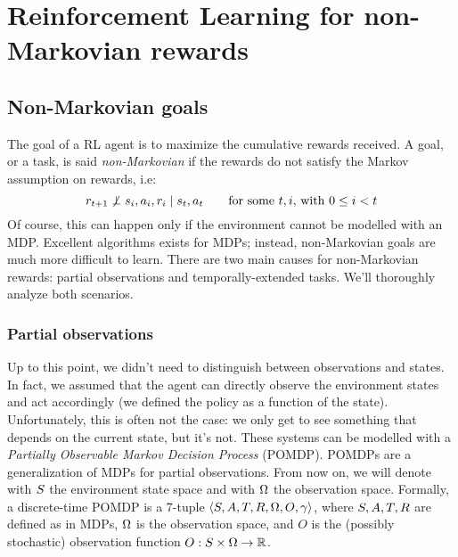 \chapter{Reinforcement Learning for non-Markovian rewards}

\label{ch:nonmarkovrl}

\section{Non-Markovian goals}

\label{sec:non-markov}

The goal of a RL agent is to maximize the cumulative rewards received.  A
goal, or a task, is said \emph{non-Markovian} if the rewards do not satisfy
the Markov assumption on rewards, i.e:
\begin{equation}
	r_{t+1} \not\perp s_i, a_i, r_i \mid s_t, a_t
	\qquad \text{for some $t, i$, with $0 \le i < t$}
	\label{eq:markov-rewards}
\end{equation}
Of course, this can happen only if the environment cannot be modelled with an
MDP. Excellent algorithms exists for MDPs; instead, non-Markovian goals are
much more difficult to learn.  There are two main causes for non-Markovian
rewards: partial observations and temporally-extended tasks. We'll thoroughly
analyze both scenarios.


\subsection{Partial observations}

\label{sec:partial-obs}

Up to this point, we didn't need to distinguish between observations and
states. In fact, we assumed that the agent can directly observe the
environment states and act accordingly (we defined the policy as a function of
the state). Unfortunately, this is often not the case: we only get to see
something that depends on the current state, but it's not. These systems can
be modelled with a \emph{Partially Observable Markov Decision Process}
(POMDP).
POMDPs are a generalization of MDPs for partial observations. From now on, we
will denote with $S$ the environment state space and with $\Omega$ the
observation space. Formally, a discrete-time POMDP is a 7-tuple ${\langle
S, A, T, R, \Omega, O, \gamma \rangle}$, where $S, A, T, R$ are
defined as in MDPs, $\Omega$ is the observation space, and $O$ is the (possibly
stochastic) observation function ${O: S \times \Omega \to \mathbb{R}}$.

